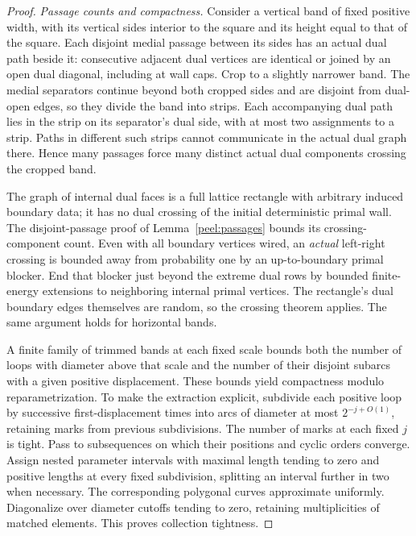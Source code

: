 \begin{proof}
\textit{Passage counts and compactness.}
Consider a vertical band of fixed positive width, with its vertical
sides interior to the square and its height equal to that of the
square.  Each disjoint medial passage between its sides has an actual
dual path beside it: consecutive adjacent dual vertices are identical
or joined by an open dual diagonal, including at wall caps.  Crop to
a slightly narrower band.  The medial separators continue beyond both
cropped sides and are disjoint from dual-open edges, so they divide
the band into strips.  Each accompanying dual path lies in the strip
on its separator's dual side, with at most two assignments to a strip.
Paths in different such strips cannot communicate in the actual dual
graph there.  Hence many passages force many distinct actual dual
components crossing the cropped band.

The graph of internal dual faces is a full lattice rectangle with
arbitrary induced boundary data; it has no dual crossing of the
initial deterministic primal wall.  The disjoint-passage proof of
Lemma~\ref{peel:passages} bounds its crossing-component count.
Even with all boundary vertices wired, an \emph{actual} left-right
crossing is bounded away from probability one by an up-to-boundary
primal blocker.  End that blocker just beyond the extreme dual rows
by bounded finite-energy extensions to neighboring internal primal
vertices.  The rectangle's dual boundary edges themselves are random,
so the crossing theorem applies.  The same argument holds for
horizontal bands.

A finite family of trimmed bands at each fixed scale bounds both the
number of loops with diameter above that scale and the number of their
disjoint subarcs with a given positive displacement.  These bounds
yield compactness modulo reparametrization.  To make the extraction
explicit, subdivide each positive loop by successive first-displacement
times into arcs of diameter at most $2^{-j+O(1)}$, retaining marks from
previous subdivisions.  The number of marks at each fixed $j$ is
tight.  Pass to subsequences on which their positions and cyclic orders
converge.  Assign nested parameter intervals with maximal length
tending to zero and positive lengths at every fixed subdivision,
splitting an interval further in two when necessary.  The corresponding
polygonal curves approximate uniformly.  Diagonalize over diameter
cutoffs tending to zero, retaining multiplicities of matched elements.
This proves collection tightness.


\end{proof}

